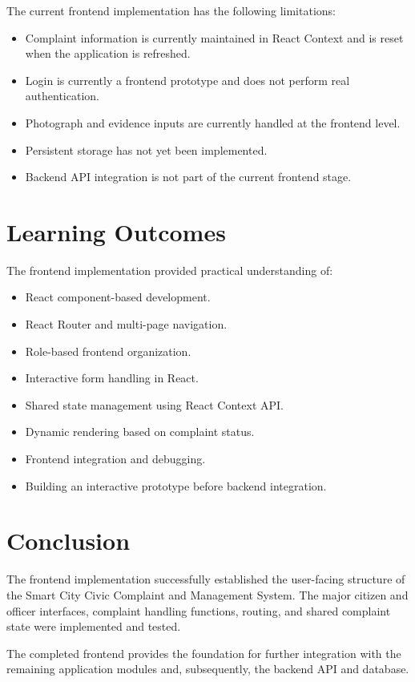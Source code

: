 \documentclass[12pt,a4paper]{article}
\begin{document}
The current frontend implementation has the following limitations:

\begin{itemize}
    \item Complaint information is currently maintained in React Context and
    is reset when the application is refreshed.
    
    \item Login is currently a frontend prototype and does not perform real
    authentication.
    
    \item Photograph and evidence inputs are currently handled at the
    frontend level.
    
    \item Persistent storage has not yet been implemented.
    
    \item Backend API integration is not part of the current frontend stage.
\end{itemize}

\section{Learning Outcomes}

The frontend implementation provided practical understanding of:

\begin{itemize}
    \item React component-based development.
    \item React Router and multi-page navigation.
    \item Role-based frontend organization.
    \item Interactive form handling in React.
    \item Shared state management using React Context API.
    \item Dynamic rendering based on complaint status.
    \item Frontend integration and debugging.
    \item Building an interactive prototype before backend integration.
\end{itemize}

\section{Conclusion}

The frontend implementation successfully established the user-facing
structure of the Smart City Civic Complaint and Management System. The major
citizen and officer interfaces, complaint handling functions, routing, and
shared complaint state were implemented and tested.

The completed frontend provides the foundation for further integration with
the remaining application modules and, subsequently, the backend API and
database.

\end{document}
